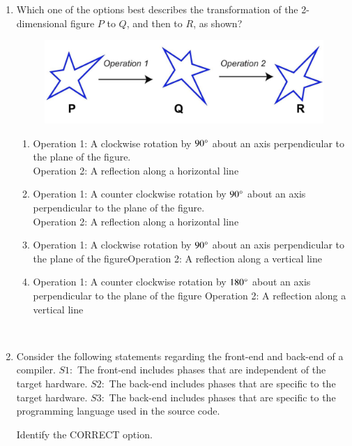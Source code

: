 \documentclass[journal,12pt,onecolumn]{IEEEtran}
\theoremstyle{remark}
\begin{document}
\begin{enumerate}
		\item Which one of the options best describes the transformation of the 2-dimensional figure $P$ to $Q$, and then to $R$, as shown?
\begin{figure}[H]
	\centering
	\includegraphics[width=0.3\linewidth]{figs/screenshot001}
	\caption{}
	\label{fig:screenshot001}
\end{figure}
\hfill{}
\begin{enumerate}
\item Operation 1: A clockwise rotation by $90\degree$ about an axis perpendicular to the plane of the figure.\\
Operation 2: A reflection along a horizontal line\\
\item Operation 1: A counter clockwise rotation by $90\degree$ about an axis perpendicular to the plane of the figure.\\Operation 2: A reflection along a horizontal line\\
\item Operation 1: A clockwise rotation by $90\degree$ about an axis perpendicular to the plane of the figureOperation 2: A reflection along a vertical line\\
\item Operation 1: A counter clockwise rotation by $180\degree$ about an axis perpendicular to the plane of the figure Operation 2: A reflection along a vertical line\\
\end{enumerate}
			\\
		\item Consider the following statements regarding the front-end and back-end of a compiler.  
		$S1\colon$ The front-end includes phases that are independent of the target hardware.  
		$S2\colon$ The back-end includes phases that are specific to the target hardware.  
		$S3\colon$ The back-end includes phases that are specific to the programming language used in the source code.  
		
		Identify the CORRECT option.
		
\hfill{}
		
		\begin{enumerate}
		\end{enumerate}
		

\end{enumerate}
\end{document}
